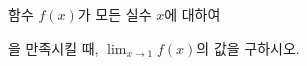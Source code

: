 함수 $f(x)$가 모든 실수 $x$에 대하여 \par\smallskip{}\par\smallskip\noindent 을 만족시킬 때, $\displaystyle\lim_{x\to 1}f(x)$의 값을 구하시오.
